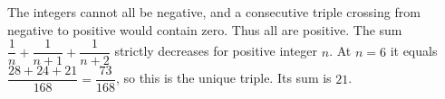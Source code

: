 The integers cannot all be negative, and a consecutive triple crossing from negative to positive would contain zero. Thus all are positive. The sum $\dfrac{1}{n}+\dfrac{1}{n+1}+\dfrac{1}{n+2}$ strictly decreases for positive integer $n$. At $n=6$ it equals $\dfrac{28+24+21}{168}=\dfrac{73}{168}$, so this is the unique triple. Its sum is $\boxed{21}$.

